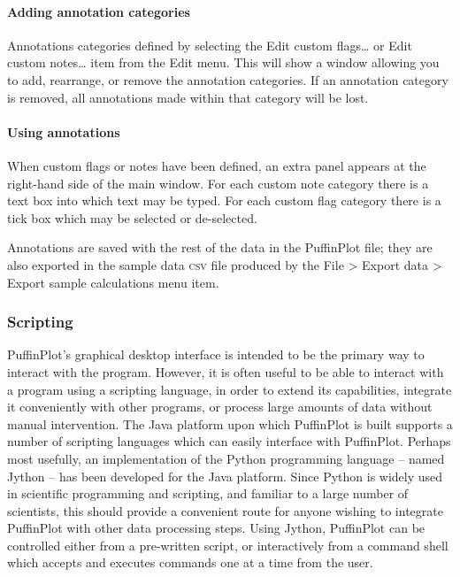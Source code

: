\documentclass[a4paper]{article}
\newcommand{\ppcmd}[1]{\textsf{#1}} %
\newcommand{\caps}[1]{\textsc{#1}} %
\newcommand{\submenu}{ \textgreater{} } %
\begin{document}
\paragraph{Adding annotation categories}

Annotations categories defined by selecting the \ppcmd{Edit custom
  flags\ldots} or \ppcmd{Edit custom notes\ldots} item from the \ppcmd{Edit}
menu. This will show a window allowing you to add, rearrange, or remove the
annotation categories. If an annotation category is removed, all annotations
made within that category will be lost.

\paragraph{Using annotations}

When custom flags or notes have been defined, an extra panel appears at the
right-hand side of the main window. For each custom note category there is a
text box into which text may be typed. For each custom flag category there is
a tick box which may be selected or de-selected.

Annotations are saved with the rest of the data in the PuffinPlot file; they
are also exported in the sample data \caps{csv} file produced by the
\ppcmd{File\submenu Export data\submenu Export sample calculations} menu
item.

\subsubsection{\label{sec:manual-scripting}Scripting}

PuffinPlot's graphical desktop interface is intended to be the primary way to
interact with the program. However, it is often useful to be able to interact
with a program using a scripting language, in order to extend its
capabilities, integrate it conveniently with other programs, or process large
amounts of data without manual intervention. The Java platform upon which
PuffinPlot is built supports a number of scripting languages which can easily
interface with PuffinPlot. Perhaps most usefully, an implementation of the
Python programming language -- named Jython \citep{juneau2009jython} -- has
been developed for the Java platform. Since Python is widely used in
scientific programming and scripting, and familiar to a large number of
scientists, this should provide a convenient route for anyone wishing to
integrate PuffinPlot with other data processing steps. Using Jython,
PuffinPlot can be controlled either from a pre-written script, or
interactively from a command shell which accepts and executes commands one at
a time from the user.
\end{document}
